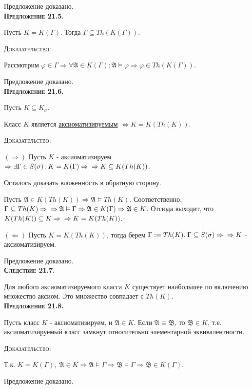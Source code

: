 \documentclass[18pt, a4paper]{extarticle}
\newcommand{\predl}[1]{\textbf{\textsc{Предложение #1}}}
\newcommand{\sled}[1]{\textbf{\textsc{Следствие #1}}}
\newcommand{\Gm}{\Gamma}
\newcommand{\vp}{\varphi}
\newcommand{\vD}{\vDash}
\newcommand{\sg}{\sigma}
\newcommand{\rightdok}{\boxed{(\Rightarrow)}}
\newcommand{\leftdok}{\boxed{(\Leftarrow)}}
\newcommand{\mA}{\mathfrak{A}}
\newcommand{\mB}{\mathfrak{B}}
\newcommand{\dok}{\textsc{Доказательство:}}
\begin{document}
Предложение доказано.\\

\predl{21.5.}

Пусть $K=K(\Gm)$. Тогда $\Gm\subseteq Th(K(\Gm))$.

\dok

Рассмотрим $\vp\in\Gm\Rightarrow\forall\mA\in K(\Gm)\!:\mA\vD\vp\Rightarrow\vp\in Th(K(\Gm))$. 

Предложение доказано.\\

\predl {21.6.}

Пусть $K\subseteq K_\sg$. 

Класс $K$ является \underline{аксиоматизируемым} $\Leftrightarrow K=K(Th(K))$.

\dok 

$\rightdok$ Пусть $K$ - аксиоматизируем $\Rightarrow\exists\Gm\in S(\sg)\!:K=K(\Gm)\Rightarrow\newline\Rightarrow K\subseteq K(Th(K))$.

Осталось доказать вложенность в обратную сторону. 

Пусть $\mA\in K(Th(K))\Rightarrow\mA\vD Th(K)$. Соответственно, $\Gm\subseteq Th(K)\Rightarrow\newline \Rightarrow\mA\vD\Gm\Rightarrow\mA\in K(\Gm)\Rightarrow\mA\in K$. Отсюда выходит, что $K(Th(K))\subseteq K\Rightarrow\newline \Rightarrow K=K(Th(K))$.

$\leftdok$ Пусть $K=K(Th(K))$, тогда берем $\Gm:=Th(K).\;\Gm\subseteq S(\sg)\Rightarrow\newline \Rightarrow K$ - аксиоматизируем.

Предложение доказано.\\

\sled {21.7.}

Для любого аксиоматизируемого класса $K$ существует
наибольшее по включению множество аксиом. Это множество совпадает с $Th(K)$.\\

\predl {21.8.}

Пусть класс $K$ - аксиоматизируем, и $\mA\in K$. Если $\mA\equiv\mB$, то $\mB\in K$, т.е. аксиоматизируемый класс замкнут относительно элементарной эквивалентности.

\dok 

Т.к. $K=K(\Gm),\;\mA\in K\Rightarrow\mA\vD\Gm\Rightarrow\mB\vD\Gm\Rightarrow\mB\in K(\Gm)$.

Предложение доказано.\\
\end{document}
